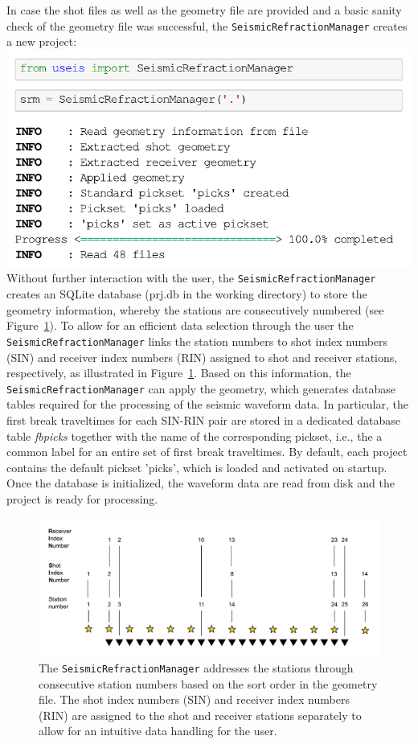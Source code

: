 \documentclass[a4paper,fleqn]{cas-sc}
\begin{document}
In case the shot files as well as the geometry file are provided and a basic sanity check of the geometry file was successful, the \texttt{SeismicRefractionManager} creates a new project:
\newline
\includegraphics[width=.5\textwidth]{./figures/create_project.pdf}
\newline
Without further interaction with the user, the \texttt{SeismicRefractionManager} creates an SQLite database (prj.db in the working directory) to store the geometry information, whereby the stations are consecutively numbered (see Figure~\ref{fig:statnum}). To allow for an efficient data selection through the user the \texttt{SeismicRefractionManager} links the station numbers to shot index numbers (SIN) and receiver index numbers (RIN) assigned to shot and receiver stations, respectively, as illustrated in Figure~\ref{fig:statnum}. Based on this information, the \texttt{SeismicRefractionManager} can apply the geometry, which generates database tables required for the processing of the seismic waveform data.
In particular, the first break traveltimes for each SIN-RIN pair are stored in a dedicated database table \textit{fbpicks} together with the name of the corresponding pickset, i.e., the a common label for an entire set of first break traveltimes. By default, each project contains the default pickset 'picks', which is loaded and activated on startup. Once the database is initialized, the waveform data are read from disk and the project is ready for processing.
\begin{figure}
	\centering
	\includegraphics[width=.75\textwidth]{figures/station_numbering.pdf}
	\caption{The \texttt{SeismicRefractionManager} addresses the stations through consecutive station numbers based on the sort order in the geometry file. The shot index numbers (SIN) and receiver index numbers (RIN) are assigned to the shot and receiver stations separately to allow for an intuitive data handling for the user.}
	\label{fig:statnum}
\end{figure}
\end{document}
